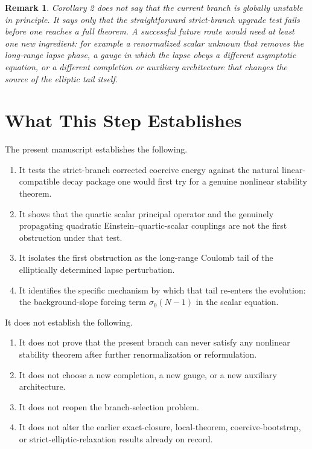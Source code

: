 \documentclass[11pt]{article}
\newtheorem{remark}{Remark}
\begin{document}
\begin{remark}
Corollary 2 does \emph{not} say that the current branch is globally unstable in principle. It says only that the \emph{straightforward} strict-branch upgrade test fails before one reaches a full theorem. A successful future route would need at least one new ingredient: for example a renormalized scalar unknown that removes the long-range lapse phase, a gauge in which the lapse obeys a different asymptotic equation, or a different completion or auxiliary architecture that changes the source of the elliptic tail itself.
\end{remark}

\section{What This Step Establishes}

The present manuscript establishes the following.
\begin{enumerate}
    \item It tests the strict-branch corrected coercive energy against the natural linear-compatible decay package one would first try for a genuine nonlinear stability theorem.
    \item It shows that the quartic scalar principal operator and the genuinely propagating quadratic Einstein--quartic-scalar couplings are not the first obstruction under that test.
    \item It isolates the first obstruction as the long-range Coulomb tail of the elliptically determined lapse perturbation.
    \item It identifies the specific mechanism by which that tail re-enters the evolution: the background-slope forcing term \(\sigma_0(N-1)\) in the scalar equation.
\end{enumerate}

It does not establish the following.
\begin{enumerate}
    \item It does not prove that the present branch can never satisfy any nonlinear stability theorem after further renormalization or reformulation.
    \item It does not choose a new completion, a new gauge, or a new auxiliary architecture.
    \item It does not reopen the branch-selection problem.
    \item It does not alter the earlier exact-closure, local-theorem, coercive-bootstrap, or strict-elliptic-relaxation results already on record.
\end{enumerate}
\end{document}
